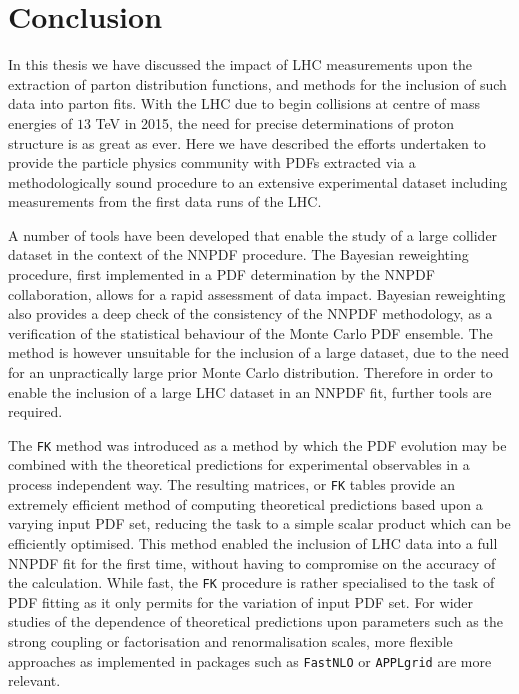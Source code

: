 \chapter{Conclusion}
\label{ch:con}

In this thesis we have discussed the impact of LHC measurements upon the extraction of parton distribution functions, and methods for the inclusion of such data into parton fits. With the LHC due to begin collisions at centre of mass energies of $13$ TeV in 2015, the need for precise determinations of proton structure is as great as ever. Here we have described the efforts undertaken to provide the particle physics community with PDFs extracted via a methodologically sound procedure to an extensive experimental dataset including measurements from the first data runs of the LHC.

A number of tools have been developed that enable the study of a large collider dataset in the context of the NNPDF procedure. The Bayesian reweighting procedure, first implemented in a PDF determination by the NNPDF collaboration, allows for a rapid assessment of data impact. Bayesian reweighting also provides a deep check of the consistency of the NNPDF methodology, as a verification of the statistical behaviour of the Monte Carlo PDF ensemble. The method is however unsuitable for the inclusion of a large dataset, due to the need for an unpractically large prior Monte Carlo distribution. Therefore in order to enable the inclusion of a large LHC dataset in an NNPDF fit, further tools are required.

The {\tt FK} method was introduced as a method by which the PDF evolution may be combined with the theoretical predictions for experimental observables in a process independent way. The resulting matrices, or {\tt FK} tables provide an extremely efficient method of computing theoretical predictions based upon a varying input PDF set, reducing the task to a simple scalar product which can be efficiently optimised. This method enabled the inclusion of LHC data into a full NNPDF fit for the first time, without having to compromise on the accuracy of the calculation. While fast, the {\tt FK} procedure is rather specialised to the task of PDF fitting as it only permits for the variation of input PDF set. For wider studies of the dependence of theoretical predictions upon parameters such as the strong coupling or factorisation and renormalisation scales, more flexible approaches as implemented in packages such as {\tt FastNLO} or {\tt APPLgrid} are more relevant.

